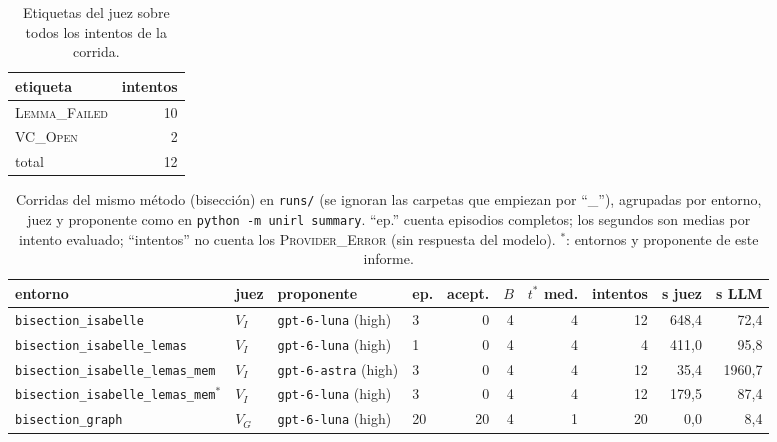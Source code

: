 \documentclass[11pt,a4paper]{article}
\begin{document}
\begin{table}[!ht]
\centering
\footnotesize
\setlength{\tabcolsep}{4pt}
\begin{tabular}{@{}lr@{}}
\toprule
etiqueta & intentos \\
\midrule
\textsc{Lemma\_Failed} & 10 \\
\textsc{VC\_Open} & 2 \\
total & 12 \\
\bottomrule
\end{tabular}
\caption{Etiquetas del juez sobre todos los intentos de la corrida.}
\label{tab:etiquetas}
\end{table}

\begin{table}[!ht]
\centering
\scriptsize
\setlength{\tabcolsep}{4pt}
\begin{tabular}{@{}llllrrrrrr@{}}
\toprule
entorno & juez & proponente & ep. & acept. & $B$ & $t^*$ med. & intentos & s juez & s LLM \\
\midrule
\texttt{bisection\_\allowbreak{}isabelle} & $V_I$ & \texttt{gpt-\allowbreak{}6-\allowbreak{}luna} (high) & 3 & 0 & 4 & 4 & 12 & 648{,}4 & 72{,}4 \\
\texttt{bisection\_\allowbreak{}isabelle\_\allowbreak{}lemas} & $V_I$ & \texttt{gpt-\allowbreak{}6-\allowbreak{}luna} (high) & 1 & 0 & 4 & 4 & 4 & 411{,}0 & 95{,}8 \\
\texttt{bisection\_\allowbreak{}isabelle\_\allowbreak{}lemas\_\allowbreak{}mem} & $V_I$ & \texttt{gpt-\allowbreak{}6-\allowbreak{}astra} (high) & 3 & 0 & 4 & 4 & 12 & 35{,}4 & 1960{,}7 \\
\texttt{bisection\_\allowbreak{}isabelle\_\allowbreak{}lemas\_\allowbreak{}mem}$^\ast$ & $V_I$ & \texttt{gpt-\allowbreak{}6-\allowbreak{}luna} (high) & 3 & 0 & 4 & 4 & 12 & 179{,}5 & 87{,}4 \\
\texttt{bisection\_\allowbreak{}graph} & $V_G$ & \texttt{gpt-\allowbreak{}6-\allowbreak{}luna} (high) & 20 & 20 & 4 & 1 & 20 & 0{,}0 & 8{,}4 \\
\bottomrule
\end{tabular}
\caption{Corridas del mismo método (bisección) en \texttt{runs/} (se ignoran las carpetas que empiezan por ``\_''), agrupadas por entorno, juez y proponente como en \texttt{python -m unirl summary}. ``ep.'' cuenta episodios completos; los segundos son medias por intento evaluado; ``intentos'' no cuenta los \textsc{Provider\_Error} (sin respuesta del modelo). $^\ast$: entornos y proponente de este informe.}
\label{tab:comparacion}
\end{table}
\end{document}
